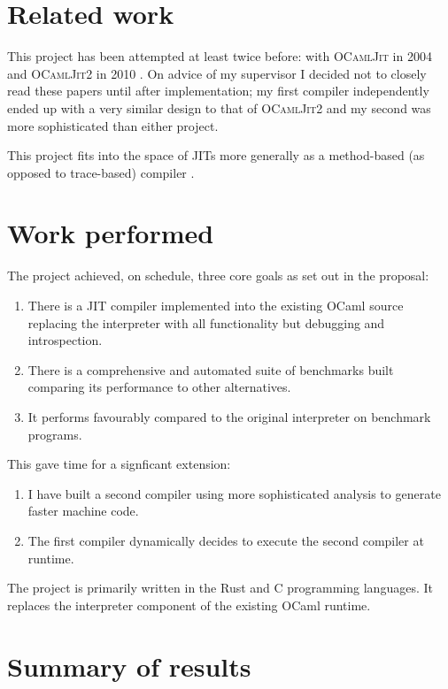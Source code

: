 \section{Related work}

This project has been attempted at least twice before: with \textsc{OCamlJit} in 2004 \cite{ocjit1}
and \textsc{OCamlJit2} in 2010 \cite{ocjit2}. On advice of my supervisor I decided not to closely
read these papers until after implementation; my first compiler independently ended up with a very
similar design to that of \textsc{OCamlJit2} and my second was more sophisticated than either
project.

This project fits into the space of JITs more generally as a method-based (as opposed to
trace-based) compiler \cite{pyket}.

\section{Work performed}

The project achieved, on schedule, three core goals as set out in the proposal:

\begin{enumerate}
    \item There is a JIT compiler implemented into the existing OCaml source
          replacing the interpreter with all functionality but debugging
          and introspection.
    \item There is a comprehensive and automated suite of benchmarks built
          comparing its performance to other alternatives.
    \item It performs favourably compared to the original interpreter on benchmark programs.
\end{enumerate}

This gave time for a signficant extension:

\begin{enumerate}
    \item I have built a second compiler using more sophisticated analysis to generate faster
          machine code.
    \item The first compiler dynamically decides to execute the second compiler at runtime.
\end{enumerate}

The project is primarily written in the Rust and C programming languages. It replaces the
interpreter component of the existing OCaml runtime.

\section{Summary of results}


